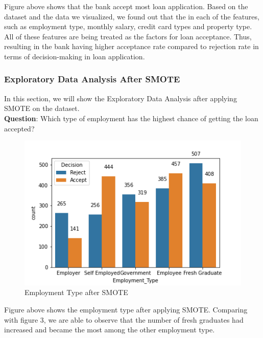 \documentclass[11pt]{article}
\begin{document}
Figure above shows that the bank accept most loan application. Based on the dataset and the data we visualized, we found out that the in each of the features, such as employment type, monthly salary, credit card types and property type. All of these features are being treated as the factors for loan acceptance. Thus, resulting in the bank having higher acceptance rate compared to rejection rate in terms of decision-making in loan application. 
\clearpage


\subsubsection{Exploratory Data Analysis After SMOTE}
In this section, we will show the Exploratory Data Analysis after applying SMOTE on the dataset. \\
\noindent \textbf{Question}: Which type of employment has the highest chance of getting the loan accepted?
\begin{figure}[h]
\centerline{\includegraphics[scale=0.8]{aSMOTE_employment.png} }
\label{fig:aSmoteEmploy}
\caption{Employment Type after SMOTE}
\end{figure}

Figure above shows the employment type after applying SMOTE. Comparing with figure 3, we are able to observe that the number of fresh graduates had increased and became the most among the other employment type.
\clearpage
\end{document}
